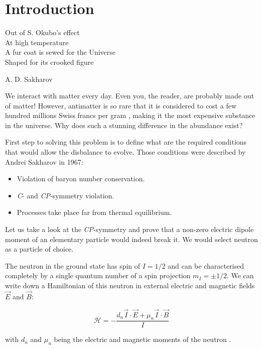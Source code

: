 \chapter{Introduction}
\label{chapter:introduction}

\setlength{\epigraphwidth}{0.43\textwidth}
\epigraph{
Out of S. Okubo's effect\\
At high temperature\\
A fur coat is sewed for the Universe\\
Shaped for its crooked figure
}{A. D. Sakharov \cite{Sakharov1991}}

We interact with matter every day. Even you, the reader, are probably made out of matter! However, antimatter is so rare that it is considered to cost a few hundred millions Swiss francs per gram \cite{DeRujula2001}, making it the most expensive substance in the universe. Why does such a stunning difference in the abundance exist?

First step to solving this problem is to define what are the required conditions that would allow the disbalance to evolve. Those conditions \cite{Dubbers2011} were described \cite{Sakharov1991} by Andrei Sakharov in 1967:

\begin{itemize}
	\item Violation of baryon number conservation.
	\item \textit{C}- and \textit{CP}-symmetry violation.
	\item Processes take place far from thermal equilibrium.
\end{itemize}

Let us take a look at the \textit{CP}-symmetry and prove that a non-zero electric dipole moment of an elementary particle would indeed break it. We would select neutron as a particle of choice.

The neutron in the ground state has spin of $I = 1/2$ and can be characterised completely by a single quantum number of a spin projection $m_I = \pm 1/2$. We can write down a Hamiltonian \cite{Golub1994} of this neutron in external electric and magnetic fields $\vec{E}$ and $\vec{B}$:

\begin{equation}
	\mathcal{H} = -\frac{d_n \vec{I} \cdot \vec{E} + \mu_n \vec{I} \cdot \vec{B}}{I}
	\label{eq:neutron_hamiltonian}
\end{equation}

with $d_n$ and $\mu_n$ being the electric and magnetic moments of the neutron \cite{Golub1972}.

